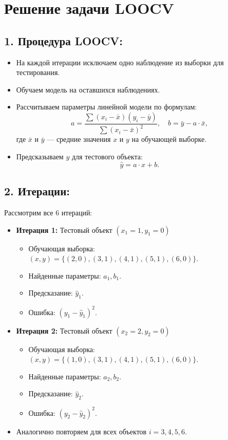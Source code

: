 \section*{Решение задачи LOOCV}


\subsection*{1. Процедура LOOCV:}
\begin{itemize}
    \item На каждой итерации исключаем одно наблюдение из выборки для тестирования.
    \item Обучаем модель на оставшихся наблюдениях.
    \item Рассчитываем параметры линейной модели по формулам:
    \[
    a = \frac{\sum (x_i - \bar{x})(y_i - \bar{y})}{\sum (x_i - \bar{x})^2}, \quad b = \bar{y} - a \cdot \bar{x},
    \]
    где \(\bar{x}\) и \(\bar{y}\) — средние значения \(x\) и \(y\) на обучающей выборке.
    \item Предсказываем \(y\) для тестового объекта:
    \[
    \hat{y} = a \cdot x + b.
    \]
\end{itemize}

\subsection*{2. Итерации:}
Рассмотрим все 6 итераций:
\begin{itemize}
    \item \textbf{Итерация 1:} Тестовый объект \( (x_1 = 1, y_1 = 0) \)
    \begin{itemize}
        \item Обучающая выборка: \( (x, y) = \{(2, 0), (3, 1), (4, 1), (5, 1), (6, 0)\} \).
        \item Найденные параметры: \( a_1, b_1 \).
        \item Предсказание: \( \hat{y}_1 \).
        \item Ошибка: \( (y_1 - \hat{y}_1)^2 \).
    \end{itemize}
    \item \textbf{Итерация 2:} Тестовый объект \( (x_2 = 2, y_2 = 0) \)
    \begin{itemize}
        \item Обучающая выборка: \( (x, y) = \{(1, 0), (3, 1), (4, 1), (5, 1), (6, 0)\} \).
        \item Найденные параметры: \( a_2, b_2 \).
        \item Предсказание: \( \hat{y}_2 \).
        \item Ошибка: \( (y_2 - \hat{y}_2)^2 \).
    \end{itemize}
    \item Аналогично повторяем для всех объектов \( i = 3, 4, 5, 6 \).
\end{itemize}

